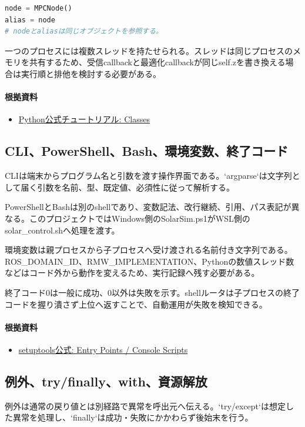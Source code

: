\documentclass[a4paper,11pt]{article}
\begin{document}
\begin{lstlisting}[language=python]
node = MPCNode()
alias = node
# nodeとaliasは同じオブジェクトを参照する。
\end{lstlisting}


一つのプロセスには複数スレッドを持たせられる。スレッドは同じプロセスのメモリを共有するため、受信callbackと最適化callbackが同じself.zを書き換える場合は実行順と排他を検討する必要がある。

\paragraph{根拠資料}
\begin{itemize}[leftmargin=1.6em]
\item \href{https://docs.python.org/3/tutorial/classes.html}{Python公式チュートリアル: Classes}
\end{itemize}

\subsection{CLI、PowerShell、Bash、環境変数、終了コード}
CLIは端末からプログラム名と引数を渡す操作界面である。`argparse`は文字列として届く引数を名前、型、既定値、必須性に従って解析する。


PowerShellとBashは別のshellであり、変数記法、改行継続、引用、パス表記が異なる。このプロジェクトではWindows側のSolarSim.ps1がWSL側のsolar\_control.shへ処理を渡す。


環境変数は親プロセスから子プロセスへ受け渡される名前付き文字列である。ROS\_DOMAIN\_ID、RMW\_IMPLEMENTATION、Pythonの数値スレッド数などはコード外から動作を変えるため、実行記録へ残す必要がある。


終了コード0は一般に成功、0以外は失敗を示す。shellルータは子プロセスの終了コードを握り潰さず上位へ返すことで、自動運用が失敗を検知できる。

\paragraph{根拠資料}
\begin{itemize}[leftmargin=1.6em]
\item \href{https://setuptools.pypa.io/en/latest/userguide/entry_point.html}{setuptools公式: Entry Points / Console Scripts}
\end{itemize}

\subsection{例外、try/finally、with、資源解放}
例外は通常の戻り値とは別経路で異常を呼出元へ伝える。`try/except`は想定した異常を処理し、`finally`は成功・失敗にかかわらず後始末を行う。
\end{document}
